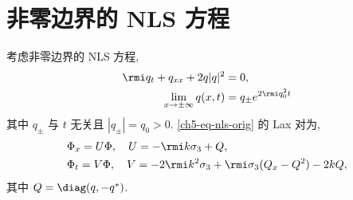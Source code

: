 \section{非零边界的 NLS 方程}
考虑非零边界的 NLS 方程,
\begin{align}
    \rmi q_{t} + q_{xx} + 2 q | q|^2 & = 0, \label{ch5-eq-nls-orig}   \\
    \lim_{x \to \pm \infty} q(x,t)   & = q_{\pm} e^{2 \rmi q_{0}^2 t}
\end{align}
其中 $ q_{\pm}$ 与 $t$ 无关且 $ |q_{\pm}| = q_0 > 0 $. \eqref{ch5-eq-nls-orig} 的 Lax 对为,
\begin{equation} \label{ch5-eq-lax-orig}
    \begin{aligned}
         & \Phi_x = U \Phi, \quad U = -\rmi k \sigma_3 + Q,                                          \\
         & \Phi_t = V \Phi, \quad V = -2\rmi k^2 \sigma_3 + \rmi \sigma_{3} (Q_{x} - Q^{2}) - 2 k Q,
    \end{aligned}
\end{equation}
其中 $ Q = \diag(q, -q^{*}) $.

